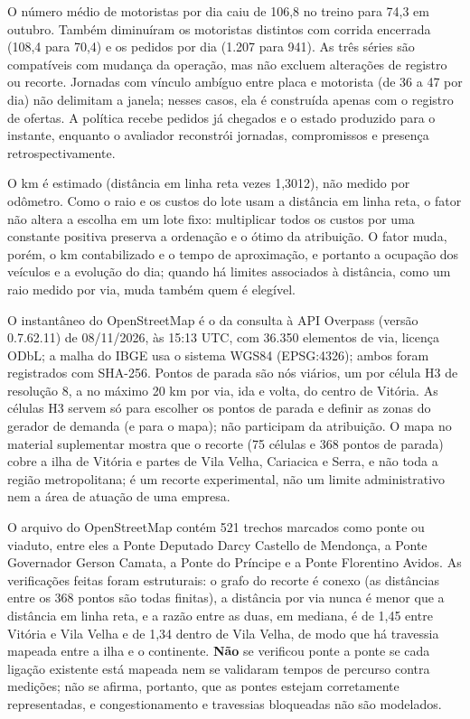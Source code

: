O número médio de motoristas por dia caiu de 106,8 no treino para 74,3 em outubro. Também diminuíram os motoristas distintos com corrida encerrada (108,4 para 70,4) e os pedidos por dia (1.207 para 941). As três séries são compatíveis com mudança da operação, mas não excluem alterações de registro ou recorte. Jornadas com vínculo ambíguo entre placa e motorista (de 36 a 47 por dia) não delimitam a janela; nesses casos, ela é construída apenas com o registro de ofertas. A política recebe pedidos já chegados e o estado produzido para o instante, enquanto o avaliador reconstrói jornadas, compromissos e presença retrospectivamente.




O km é estimado (distância em linha reta vezes 1,3012), não medido por odômetro. Como o raio e os custos do lote usam a distância em linha reta, o fator não altera a escolha em um lote fixo: multiplicar todos os custos por uma constante positiva preserva a ordenação e o ótimo da atribuição. O fator muda, porém, o km contabilizado e o tempo de aproximação, e portanto a ocupação dos veículos e a evolução do dia; quando há limites associados à distância, como um raio medido por via, muda também quem é elegível.


O instantâneo do OpenStreetMap é o da consulta à API Overpass (versão 0.7.62.11) de 08/11/2026, às 15:13 UTC, com 36.350 elementos de via, licença ODbL; a malha do IBGE usa o sistema WGS84 (EPSG:4326); ambos foram registrados com SHA-256. Pontos de parada são nós viários, um por célula H3 de resolução 8, a no máximo 20 km por via, ida e volta, do centro de Vitória. As células H3 servem só para escolher os pontos de parada e definir as zonas do gerador de demanda (e para o mapa); não participam da atribuição. O mapa no material suplementar mostra que o recorte (75 células e 368 pontos de parada) cobre a ilha de Vitória e partes de Vila Velha, Cariacica e Serra, e não toda a região metropolitana; é um recorte experimental, não um limite administrativo nem a área de atuação de uma empresa.



O arquivo do OpenStreetMap contém 521 trechos marcados como ponte ou viaduto, entre eles a Ponte Deputado Darcy Castello de Mendonça, a Ponte Governador Gerson Camata, a Ponte do Príncipe e a Ponte Florentino Avidos. As verificações feitas foram estruturais: o grafo do recorte é conexo (as distâncias entre os 368 pontos são todas finitas), a distância por via nunca é menor que a distância em linha reta, e a razão entre as duas, em mediana, é de 1,45 entre Vitória e Vila Velha e de 1,34 dentro de Vila Velha, de modo que há travessia mapeada entre a ilha e o continente. \textbf{Não} se verificou ponte a ponte se cada ligação existente está mapeada nem se validaram tempos de percurso contra medições; não se afirma, portanto, que as pontes estejam corretamente representadas, e congestionamento e travessias bloqueadas não são modelados.

